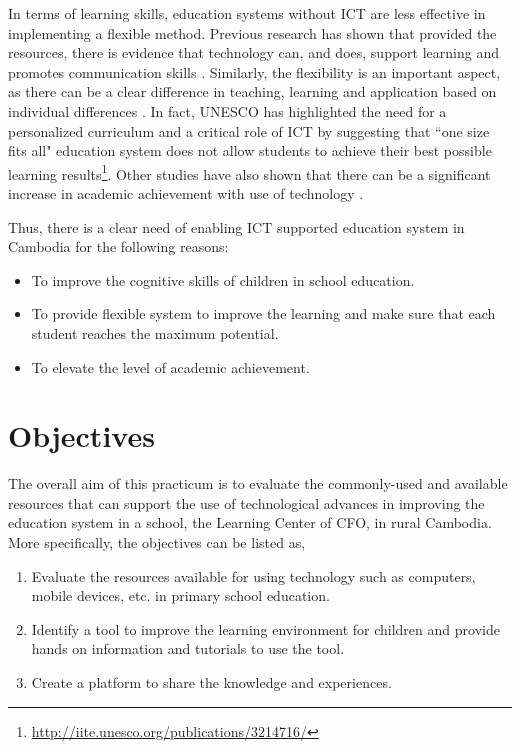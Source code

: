 In terms of learning skills, education systems without ICT are less effective in implementing a flexible method. Previous research has shown that provided the resources, there is evidence that technology can, and does, support learning and promotes communication skills \citep{marshall2002}. Similarly, the flexibility is an important aspect, as there can be a clear difference in teaching, learning and application based on individual differences \citep{Ayersman1995371}. In fact, UNESCO has highlighted the need for a personalized curriculum and a critical role of ICT by suggesting that “one size fits all" education system does not allow students to achieve their best possible learning results\footnote{\url{http://iite.unesco.org/publications/3214716/}}. Other studies have also shown that there can be a significant increase in academic achievement with use of technology \citep{zywno2002effect}. 

Thus, there is a clear need of enabling ICT supported education system in Cambodia for the following reasons:
\begin{itemize}
	\item To improve the cognitive skills of children in school education.
	\item To provide flexible system to improve the learning and make sure that each student reaches the maximum potential.
	\item To elevate the level of academic achievement.
\end{itemize}

\section{Objectives}

The overall aim of this practicum is to evaluate the commonly-used and available resources that can support the use of technological advances in improving the education system in a school, the Learning Center of CFO, in rural Cambodia. More specifically, the objectives can be listed as,

\begin{enumerate}
\item Evaluate the resources available for using technology such as computers, mobile devices, etc. in primary school education.
\item Identify a tool to improve the learning environment for children and provide hands on information and tutorials to use the tool.
\item Create a platform to share the knowledge and experiences. 

\end{enumerate}


